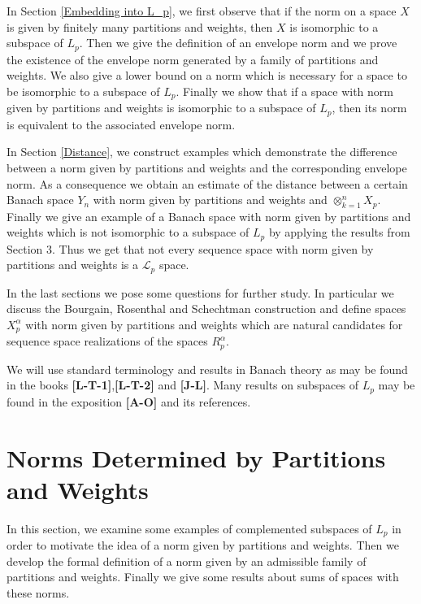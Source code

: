 \documentclass[12pt]{amsart}
\theoremstyle{definition}
\theoremstyle{remark}
\numberwithin{equation}{section}
\begin{document}
In Section \ref{Embedding into L_p},
we first observe that if the norm on a space $X$ is given by finitely 
many partitions and weights, then $X$ is isomorphic to a subspace of 
$L_p$. Then we give the definition of an envelope
norm  and we prove the
existence of the envelope norm generated by a family of partitions
and weights. We also give a lower bound on a norm which is necessary
for a space to be isomorphic to a subspace of $L_p$. Finally we show
that if a space with norm given by partitions and weights is
isomorphic to a subspace of $L_p$, then its norm is equivalent to
the associated envelope norm. 

In Section \ref{Distance}, we construct examples which demonstrate the
difference between a norm given by partitions and weights and the
corresponding envelope norm. As a consequence we obtain an estimate
of the distance
between a certain Banach space $Y_n$ with norm given by partitions and weights
and $\otimes_{k=1}^n{X_p}$. 
Finally we give an example of a Banach space with norm given by
partitions and weights which is 
not isomorphic to a subspace of $L_p$ by applying the results from Section
3. Thus we get that not every sequence space with norm given by
partitions and weights is a ${\mathcal{L}}_p$ space. 

In the last sections we pose some questions for further study. In
particular we discuss the Bourgain, Rosenthal and Schechtman
construction and define spaces $X_{p}^{\alpha}$ with norm given by 
partitions and weights which are natural candidates for sequence space
realizations of the spaces $R_{p}^{\alpha}$.

We will use standard terminology and results in Banach theory as may 
be found in the books {\bf{[L-T-1]}},{\bf{[L-T-2]}} and {\bf{[J-L]}}.
Many results on subspaces of $L_p$ may be found in the exposition 
{\bf{[A-O]}} and its references.







\section{Norms Determined by Partitions and Weights}
\label{Norms Determined by Partitions and Weights}
In this section, we examine some examples of complemented subspaces 
of $L_p$ in order to motivate the idea of a norm given by partitions 
and weights. Then we develop the formal definition of a norm given 
by an admissible family of partitions and weights. Finally we give 
some results about sums of spaces with these norms.\\
\end{document}
